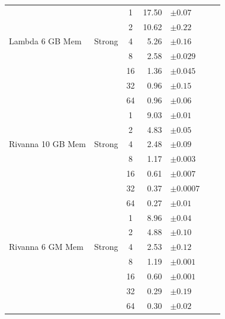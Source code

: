 \documentclass[conference]{IEEEtran}
\begin{document}
\begin{table}
\begin{tabular}{llcr @{\hspace{1\tabcolsep}} lr @{\hspace{1\tabcolsep}} l}
		\cmidrule{2-5}
    	\multirow{5}{*}{Lambda 6 GB Mem} &
		\multirow{5}{*}{Strong} &
		1                       &
		17.50 & $\pm0.07$     \\
		&
		                     &
		2                     &
		10.62 & $\pm0.22$   \\
		&
		                   &
		4                     &
		5.26 & $\pm0.16$    \\
		                    & &
		8                     &
		2.58 & $\pm0.029$      \\
		                    & &
		16                     &
		1.36 & $\pm0.045$      \\
& &
		32                     &
		0.96 & $\pm0.15$      \\
        & &
		64                     &
		0.96 & $\pm0.06$      \\
        \cmidrule{2-5}
    	\multirow{5}{*}{Rivanna 10 GB Mem} &
		\multirow{5}{*}{Strong} &
		1                       &
		9.03 & $\pm0.01$     \\
		&
		                     &
		2                     &
		4.83 & $\pm0.05$   \\
		&
		                   &
		4                     &
		2.48 & $\pm0.09$    \\
		                    & &
		8                     &
		1.17 & $\pm0.003$      \\
		                    & &
		16                     &
		0.61 & $\pm0.007$      \\
                            & &
		32                     &
		0.37 & $\pm0.0007$      \\
                            & &
		64                     &
		0.27 & $\pm0.01$      \\
        
        \cmidrule{2-5}
    	\multirow{5}{*}{Rivanna 6 GM Mem} &
		\multirow{5}{*}{Strong} &
		1                       &
		8.96 & $\pm0.04$     \\
		&
		                     &
		2                     &
		4.88 & $\pm0.10$   \\
		&
		                   &
		4                     &
		2.53 & $\pm0.12$    \\
		                    & &
		8                     &
		1.19 & $\pm0.001$      \\
		                    & &
		16                     &
		0.60 & $\pm0.001$      \\
                            & &
		32                     &
		0.29 & $\pm0.19$      \\
                            & &
		64                     &
		0.30 & $\pm0.02$      \\
		\bottomrule
	\end{tabular}
\end{table}
\end{document}
